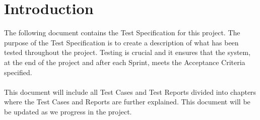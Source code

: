 \section{Introduction}
The following document contains the Test Specification for this project. The purpose of the Test Specification is to create a description of what has been tested throughout the project. Testing is crucial and it ensures that the system, at the end of the project and after each Sprint, meets the Acceptance Criteria specified.\\
\\
This document will include all Test Cases and Test Reports divided into chapters where the Test Cases and Reports are further explained. This document will be be updated as we progress in the project.